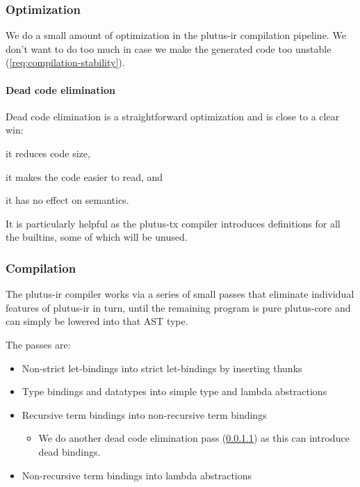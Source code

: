 \subsubsection{Optimization}

We do a small amount of optimization in the \gls{plutus-ir} compilation pipeline.
We don't want to do too much in case we make the generated code too unstable (\cref{req:compilation-stability}).

\paragraph{Dead code elimination}
\label{para:dead-code}

Dead code elimination is a straightforward optimization and is close to a clear win:
\begin{inparaenum}
\item it reduces code size,
\item it makes the code easier to read, and
\item it has no effect on semantics.
\end{inparaenum}

It is particularly helpful as the \gls{plutus-tx} compiler introduces definitions for all the builtins, some of which will be unused.

\subsubsection{Compilation}

The \gls{plutus-ir} compiler works via a series of small passes that eliminate individual features of \gls{plutus-ir} in turn, until the remaining program is pure \gls{plutus-core} and can simply be lowered into that AST type.

The passes are:
\begin{itemize}
\item Non-strict let-bindings into strict let-bindings by inserting thunks
\item Type bindings and datatypes into simple type and lambda abstractions
\item Recursive term bindings into non-recursive term bindings
  \begin{itemize}
  \item We do another dead code elimination pass (\cref{para:dead-code}) as this can introduce dead bindings.
  \end{itemize}
\item Non-recursive term bindings into lambda abstractions
\end{itemize}

